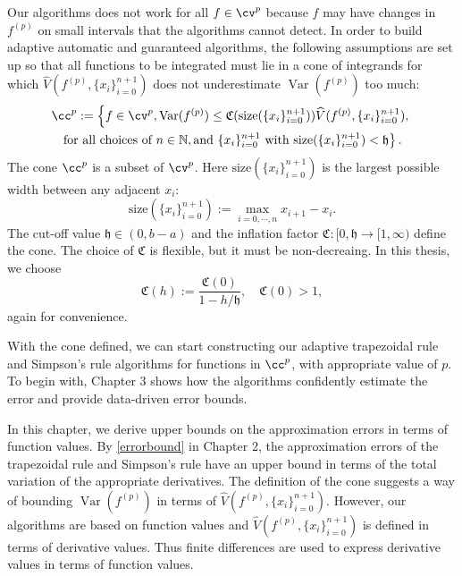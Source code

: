 \documentclass{iitthesis}
\DeclareMathOperator{\Var}{Var}
\theoremstyle{definition}
\theoremstyle{remark}
\begin{document}
Our algorithms does not work for all $f \in \cv^{p}$ because $f$ may have changes in $f^{(p)}$ on small intervals that the algorithms cannot detect. In order to build adaptive automatic and guaranteed algorithms, the following assumptions are set up so that all functions to be integrated must lie in a cone of integrands for which $\widehat{V}(f^{(p)},\{x_i\}_{i=0}^{n+1})$ does not underestimate $\Var(f^{(p)})$ too much:
\begin{multline}\label{defcone}
\cc^{p}:=\left\{f\in \cv^{p}, \Var(f^{(p)})\leq \mathfrak{C}(\text{size}(\{x_i\}_{i=0}^{n+1}))\widehat{V}(f^{(p)},\{x_i\}_{i=0}^{n+1}),\right.\\ \left.\text{for all choices of } n\in \mathbb{N}, \text{and }\{x_i\}_{i=0}^{n+1} \text{ with }\text{size}(\{x_i\}_{i=0}^{n+1})<\mathfrak{h}\right\}.
\end{multline}
The cone $\cc^{p}$ is a subset of $\cv^{p}$. Here $\text{size}(\{x_i\}_{i=0}^{n+1})$ is the largest possible width between any adjacent $x_i$:
\begin{equation}\label{defsize}
  \text{size}(\{x_i\}_{i=0}^{n+1}):=\max_{i=0,\cdots, n} x_{i+1}-x_{i}.
\end{equation}
The cut-off value $\mathfrak{h} \in (0, b-a)$ and the inflation factor $\mathfrak{C}: [0,\mathfrak{h} \rightarrow [1,\infty)$ define the cone. The choice of $\mathfrak{C}$ is flexible, but it must be non-decreaing. In this thesis, we choose
\begin{equation}\label{definflationfactor}
  \mathfrak{C}(h):=\frac{\mathfrak{C}(0)}{1-h/\mathfrak{h}}, \quad \mathfrak{C}(0)>1,
\end{equation}
again for convenience.

With the cone defined, we can start constructing our adaptive trapezoidal rule and Simpson's rule algorithms for functions in $\cc^{p}$, with appropriate value of $p$. To begin with, Chapter 3 shows how the algorithms confidently estimate the error and provide data-driven error bounds.





In this chapter, we derive upper bounds on the approximation errors in terms of function values. By \eqref{errorbound} in Chapter 2, the approximation errors of the trapezoidal rule and Simpson's rule have an upper bound in terms of the total variation of the appropriate derivatives. The definition of the cone suggests a way of bounding $\Var(f^{(p)})$ in terms of $\widehat{V}(f^{(p)},\{x_i\}_{i=0}^{n+1})$. However, our algorithms are based on function values and $\widehat{V}(f^{(p)},\{x_i\}_{i=0}^{n+1})$ is defined in terms of derivative values. Thus finite differences are used to express derivative values in terms of function values.
\end{document}
